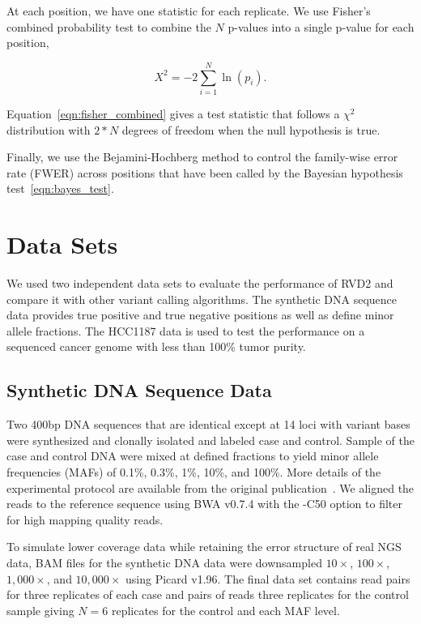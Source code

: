 \documentclass[11pt,reqno]{amsart}
\begin{document}
At each position, we have one statistic for each replicate. We use Fisher's combined probability test to combine the $N$ p-values into a single p-value for each position,

\begin{equation}\label{eqn:fisher_combined}
	X^2 = -2 \sum_{i=1}^N \ln(p_i).
\end{equation}

Equation~\eqref{eqn:fisher_combined} gives a test statistic that follows a $\chi^2$ distribution with $2*N$ degrees of freedom when the null hypothesis is true. 

Finally, we use the Bejamini-Hochberg method to control the family-wise error rate (FWER) across positions that have been called by the Bayesian hypothesis test~\eqref{eqn:bayes_test}.


\section{Data Sets}

We used two independent data sets to evaluate the performance of RVD2 and compare it with other variant calling algorithms. The synthetic DNA sequence data provides true positive and true negative positions as well as define minor allele fractions. The HCC1187 data is used to test the performance on a sequenced cancer genome with less than 100\% tumor purity.

\subsection{Synthetic DNA Sequence Data}

Two 400bp DNA sequences that are identical except at 14 loci with variant bases were synthesized and clonally isolated and labeled case and control. Sample of the case and control DNA were mixed at defined fractions to yield minor allele frequencies (MAFs) of 0.1\%, 0.3\%, 1\%, 10\%, and 100\%. More details of the experimental protocol are available from the original publication~\cite{}. We aligned the reads to the reference sequence using BWA v0.7.4 with the -C50 option to filter for high mapping quality reads.

To simulate lower coverage data while retaining the error structure of real NGS data, BAM files for the synthetic DNA data were downsampled $10\times$, $100\times$, $1,000\times$, and $10,000\times$ using Picard v1.96. The final data set contains read pairs for three replicates of each case and pairs of reads three replicates for the control sample giving $N=6$ replicates for the control and each MAF level.
\end{document}
